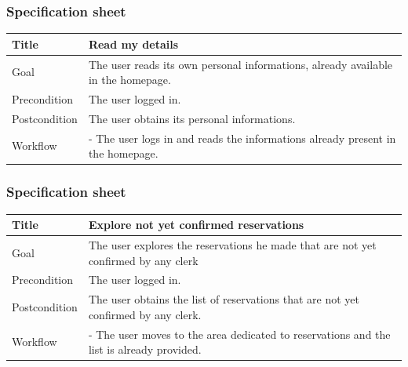 \documentclass{beamer}
\begin{document}
\begin{frame}
    \frametitle{Specification sheet}
    \begin{table}
        \tiny
        \begin{tabular}{|p{2cm}|p{6cm}|}
        \hline
        Title & \textbf{Read my details} \\
        \hline
        Goal & The user reads its own personal informations, already available in the homepage.\\
        \hline
        Precondition & The user logged in. \\
        \hline
        Postcondition & The user obtains its personal informations. \\
        \hline
        Workflow &
        - The user logs in and reads the informations already present in the homepage. \\
        \hline
        \end{tabular}
\end{table}
\end{frame}

\begin{frame}
    \frametitle{Specification sheet}
    \begin{table}
        \tiny
        \begin{tabular}{|p{2cm}|p{6cm}|}
        \hline
        Title & \textbf{Explore not yet confirmed reservations} \\
        \hline
        Goal & The user explores the reservations he made that are not yet confirmed by any clerk \\
        \hline
        Precondition & The user logged in. \\
        \hline
        Postcondition & The user obtains the list of reservations that are not yet confirmed by any clerk. \\
        \hline
        Workflow &
        - The user moves to the area dedicated to reservations and the list is already provided. \\
        \hline
        \end{tabular}
\end{table}
\end{frame}
\end{document}

